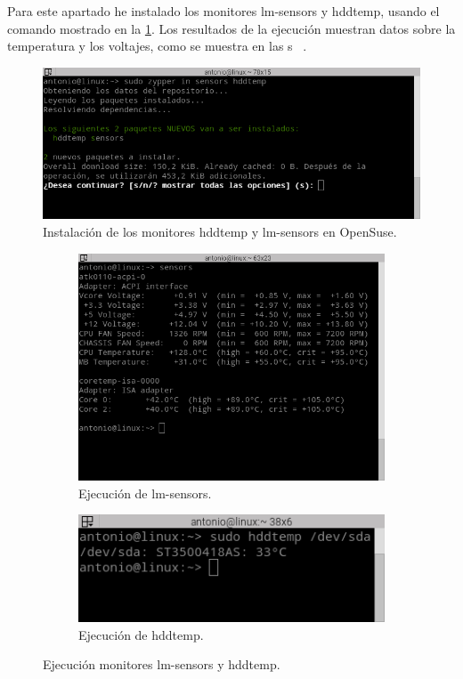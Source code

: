 Para este apartado he instalado los monitores lm-sensors y hddtemp, usando el comando mostrado en la  \cref{fig13}. Los resultados de la ejecución muestran datos sobre la temperatura y los voltajes, como se muestra en las s \ .
\begin{figure}[H]
  \begin{center}
    \includegraphics[width=1\textwidth]{imagenes/sensors}
    \caption{Instalación de los monitores hddtemp y lm-sensors en OpenSuse.}
    \label{fig13}
  \end{center}
\end{figure}

\begin{figure}[H]
    \centering
    \begin{subfigure}[b]{0.55\textwidth}
        \includegraphics[width=\textwidth]{imagenes/sensors2}
        \caption{Ejecución de lm-sensors.}
        \label{fig14}
    \end{subfigure}
    \begin{subfigure}[b]{0.4\textwidth}
        \includegraphics[width=\textwidth]{imagenes/hddtemp}
        \caption{Ejecución de hddtemp.}
        \label{fig15}
    \end{subfigure}
    \caption{Ejecución monitores lm-sensors y hddtemp.}
\end{figure}

